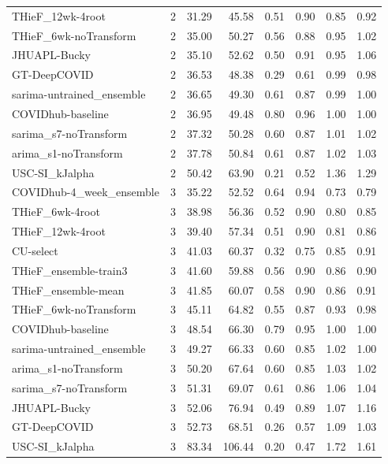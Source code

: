 \documentclass[12pt]{article}
\begin{document}
\begin{longtable}{lrrrrrrr}
  THieF\_12wk-4root & 2 & 31.29 & 45.58 & 0.51 & 0.90 & 0.85 & 0.92 \\ 
  THieF\_6wk-noTransform & 2 & 35.00 & 50.27 & 0.56 & 0.88 & 0.95 & 1.02 \\ 
  JHUAPL-Bucky & 2 & 35.10 & 52.62 & 0.50 & 0.91 & 0.95 & 1.06 \\ 
  GT-DeepCOVID & 2 & 36.53 & 48.38 & 0.29 & 0.61 & 0.99 & 0.98 \\ 
  sarima-untrained\_ensemble & 2 & 36.65 & 49.30 & 0.61 & 0.87 & 0.99 & 1.00 \\ 
  COVIDhub-baseline & 2 & 36.95 & 49.48 & 0.80 & 0.96 & 1.00 & 1.00 \\ 
  sarima\_s7-noTransform & 2 & 37.32 & 50.28 & 0.60 & 0.87 & 1.01 & 1.02 \\ 
  arima\_s1-noTransform & 2 & 37.78 & 50.84 & 0.61 & 0.87 & 1.02 & 1.03 \\ 
  USC-SI\_kJalpha & 2 & 50.42 & 63.90 & 0.21 & 0.52 & 1.36 & 1.29 \\ 
  COVIDhub-4\_week\_ensemble & 3 & 35.22 & 52.52 & 0.64 & 0.94 & 0.73 & 0.79 \\ 
  THieF\_6wk-4root & 3 & 38.98 & 56.36 & 0.52 & 0.90 & 0.80 & 0.85 \\ 
  THieF\_12wk-4root & 3 & 39.40 & 57.34 & 0.51 & 0.90 & 0.81 & 0.86 \\ 
  CU-select & 3 & 41.03 & 60.37 & 0.32 & 0.75 & 0.85 & 0.91 \\ 
  THieF\_ensemble-train3 & 3 & 41.60 & 59.88 & 0.56 & 0.90 & 0.86 & 0.90 \\ 
  THieF\_ensemble-mean & 3 & 41.85 & 60.07 & 0.58 & 0.90 & 0.86 & 0.91 \\ 
  THieF\_6wk-noTransform & 3 & 45.11 & 64.82 & 0.55 & 0.87 & 0.93 & 0.98 \\ 
  COVIDhub-baseline & 3 & 48.54 & 66.30 & 0.79 & 0.95 & 1.00 & 1.00 \\ 
  sarima-untrained\_ensemble & 3 & 49.27 & 66.33 & 0.60 & 0.85 & 1.02 & 1.00 \\ 
  arima\_s1-noTransform & 3 & 50.20 & 67.64 & 0.60 & 0.85 & 1.03 & 1.02 \\ 
  sarima\_s7-noTransform & 3 & 51.31 & 69.07 & 0.61 & 0.86 & 1.06 & 1.04 \\ 
  JHUAPL-Bucky & 3 & 52.06 & 76.94 & 0.49 & 0.89 & 1.07 & 1.16 \\ 
  GT-DeepCOVID & 3 & 52.73 & 68.51 & 0.26 & 0.57 & 1.09 & 1.03 \\ 
  USC-SI\_kJalpha & 3 & 83.34 & 106.44 & 0.20 & 0.47 & 1.72 & 1.61 \\ 

\end{longtable}
\end{document}
